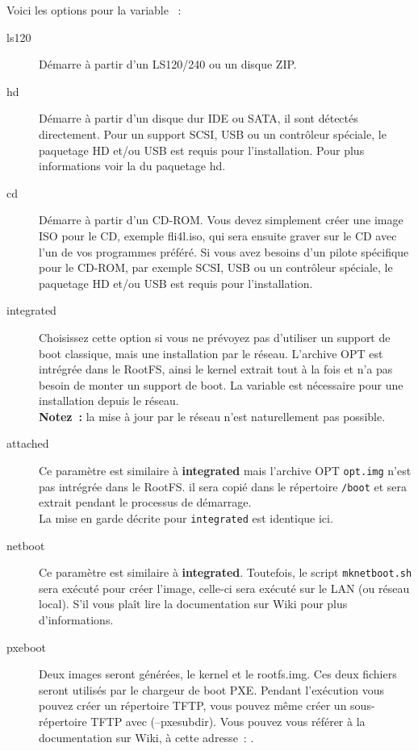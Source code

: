 \begin{description}
  Voici les options pour la variable ~:

  \begin{description}
  \item[ls120] Démarre à partir d'un LS120/240 ou un disque ZIP.
  \item[hd] Démarre à partir d'un disque dur IDE ou SATA, il sont détectés
            directement. Pour un support SCSI, USB ou un contrôleur spéciale, le
            paquetage HD et/ou USB est requis pour l'installation. Pour plus informations
            voir la  du paquetage hd.
  \item[cd] Démarre à partir d'un CD-ROM. Vous devez simplement créer une image ISO
            pour le CD, exemple fli4l.iso, qui sera ensuite graver sur le CD avec
            l'un de vos programmes préféré. Si vous avez besoins d'un pilote spécifique
			pour le CD-ROM, par exemple SCSI, USB ou un contrôleur spéciale, le paquetage
			HD et/ou USB est requis pour l'installation.
  \item[integrated] Choisissez cette option si vous ne prévoyez pas d'utiliser un support de
					boot classique, mais une installation par le réseau. L'archive OPT est
					intrégrée dans le RootFS, ainsi le kernel extrait tout à la fois et n'a
					pas besoin de monter un support de boot. La variable  est
					nécessaire pour une installation depuis le réseau.\\
        \textbf{Notez~:} la mise à jour par le réseau n'est naturellement pas possible.
  \item[attached] Ce paramètre est similaire à \textbf{integrated} mais l'archive OPT
				  \texttt{opt.img} n'est pas intrégrée dans le RootFS. il sera copié dans
				  le répertoire \texttt{/boot} et sera extrait pendant le processus de démarrage.\\
                  La mise en garde décrite pour \texttt{integrated} est identique ici.
  \item[netboot] Ce paramètre est similaire à \textbf{integrated}. Toutefois, le script
                 \texttt{mknetboot.sh} sera exécuté pour créer l'image, celle-ci sera
                 exécuté sur le LAN (ou réseau local). S'il vous plaît lire la
                 documentation sur Wiki
                 pour plus d'informations.
  \item[pxeboot] Deux images seront générées, le kernel et le rootfs.img. Ces deux fichiers
				 seront utilisés par le chargeur de boot PXE. Pendant l'exécution vous pouvez
				 créer un répertoire TFTP, vous pouvez même créer un sous-répertoire TFTP
				 avec (--pxesubdir). Vous pouvez vous référer à la documentation sur Wiki,
				 à cette adresse~:
                 .
  \end{description}


\end{description}
